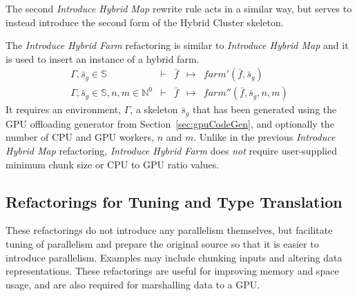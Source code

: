\documentclass[final]{jfp1}
\newcommand{\f}[0]{\bar{f}}
\newcommand{\s}[0]{\bar{s}}
\newcommand{\bs}[0]{\mathbb{S}}
\newcommand{\bn}[0]{\mathbb{N}}
\newcommand{\bnz}[0]{\bn^{0}}
\newcommand{\rewrite}[3]{#1 & \vdash{} & #2 & \mapsto{} & #3}
\begin{document}
%
The second \emph{Introduce Hybrid Map} rewrite rule
acts in a similar way, but serves to instead introduce the second form of the
Hybrid Cluster skeleton.

The \emph{Introduce Hybrid Farm} refactoring is
similar to \emph{Introduce Hybrid Map} and it is used to insert an instance of a hybrid farm.
% 
\[
\begin{array}{rclcl}
  \rewrite{\Gamma, \s_g \in \bs}{\f}{farm'(\f, \s_g)} \\
  \rewrite{\Gamma, \s_g \in \bs, n,m \in \bnz}{\f}{farm''(\f, \s_g, n, m)}
\end{array}
\]
% 
\noindent
It requires an environment, $\Gamma$, a skeleton $\s_g$ that has been generated using the GPU offloading generator from Section~\ref{sec:gpuCodeGen}, and optionally the number of CPU and GPU workers, $n$ and $m$. Unlike in the previous \emph{Introduce Hybrid Map} refactoring, \emph{Introduce Hybrid Farm} does \emph{not} require user-supplied
minimum chunk size or CPU to GPU ratio values.


\subsection{Refactorings for Tuning and Type Translation}
\label{sec:shaping}
\label{sect:progshaping}



These refactorings do not introduce any
parallelism themselves, but facilitate tuning of parallelism and prepare the original source so that it is easier
to introduce parallelism. Examples may include chunking inputs and
altering data representations. These refactorings are useful
for improving memory and space usage, and are also required for marshalling data to a GPU.
\end{document}
